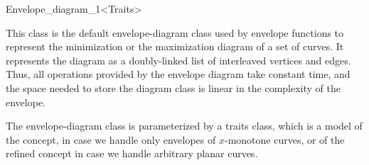 
\ccRefPageBegin

\begin{ccRefClass}{Envelope_diagram_1<Traits>}

\ccDefinition

This class is the default envelope-diagram class used by envelope functions
to represent the minimization or the maximization diagram of a set of curves. 
It represents the diagram as a doubly-linked list of interleaved vertices
and edges. Thus, all operations provided by the envelope diagram take constant
time, and the space needed to store the diagram class is linear in the
complexity of the envelope.

The envelope-diagram class is parameterized by a traits class, which is a
model of the  concept, in case we handle
only envelopes of $x$-monotone curves, or of the refined
 concept in case we handle arbitrary planar curves.


\ccIsModel

\end{ccRefClass}

\ccRefPageEnd
